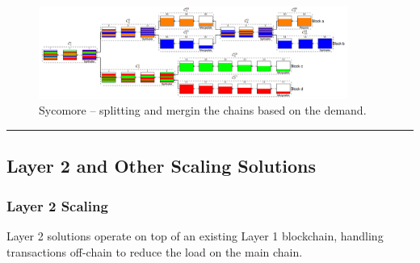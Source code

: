 \begin{figure}[t]
	\begin{center}
		\includegraphics[width=0.9\textwidth]{./figs/Sycomore.png}
		\caption{Sycomore -- splitting and mergin the chains based on the demand.}		
		\label{fig:sycomore}
	\end{center}	
\end{figure}





\begin{center}\rule{0.5\linewidth}{0.5pt}\end{center}

\subsection{Layer 2 and Other Scaling
Solutions}\label{section-4-layer-2-and-other-scaling-solutions}

\subsubsection{Layer 2 Scaling}\label{layer-2-scaling}

Layer 2 solutions operate on top of an existing Layer 1 blockchain,
handling transactions off-chain to reduce the load on the main chain.

